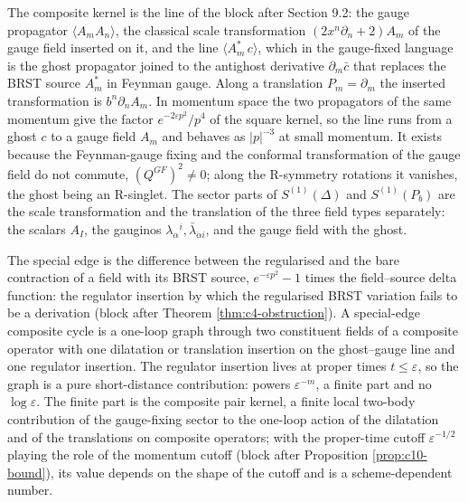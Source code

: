 \begin{remark}
The composite kernel is the line of the block after Section 9.2: the gauge propagator $\langle A_mA_n\rangle$, the classical scale transformation $(2x^n\partial_n+2)A_m$ of the gauge field inserted on it, and the line $\langle A^*_m\,c\rangle$, which in the gauge-fixed language is the ghost propagator joined to the antighost derivative $\partial_m\bar c$ that replaces the BRST source $A^*_m$ in Feynman gauge. Along a translation $P_m=\partial_m$ the inserted transformation is $b^n\partial_nA_m$. In momentum space the two propagators of the same momentum give the factor $e^{-2\varepsilon p^2}/p^4$ of the square kernel, so the line runs from a ghost $c$ to a gauge field $A_m$ and behaves as $|p|^{-3}$ at small momentum. It exists because the Feynman-gauge fixing and the conformal transformation of the gauge field do not commute, $(Q^{GF})^2\neq0$; along the R-symmetry rotations it vanishes, the ghost being an R-singlet. The sector parts of $S^{(1)}(\Delta)$ and $S^{(1)}(P_b)$ are the scale transformation and the translation of the three field types separately: the scalars $A_I$, the gauginos $\lambda_\alpha{}^i,\bar\lambda_{\dot\alpha i}$, and the gauge field with the ghost.
\end{remark}

\begin{remark}
The special edge is the difference between the regularised and the bare contraction of a field with its BRST source, $e^{-\varepsilon p^2}-1$ times the field--source delta function: the regulator insertion by which the regularised BRST variation fails to be a derivation (block after Theorem \ref{thm:c4-obstruction}). A special-edge composite cycle is a one-loop graph through two constituent fields of a composite operator with one dilatation or translation insertion on the ghost--gauge line and one regulator insertion. The regulator insertion lives at proper times $t\le\varepsilon$, so the graph is a pure short-distance contribution: powers $\varepsilon^{-m}$, a finite part and no $\log\varepsilon$. The finite part is the composite pair kernel, a finite local two-body contribution of the gauge-fixing sector to the one-loop action of the dilatation and of the translations on composite operators; with the proper-time cutoff $\varepsilon^{-1/2}$ playing the role of the momentum cutoff (block after Proposition \ref{prop:c10-bound}), its value depends on the shape of the cutoff and is a scheme-dependent number.
\end{remark}

